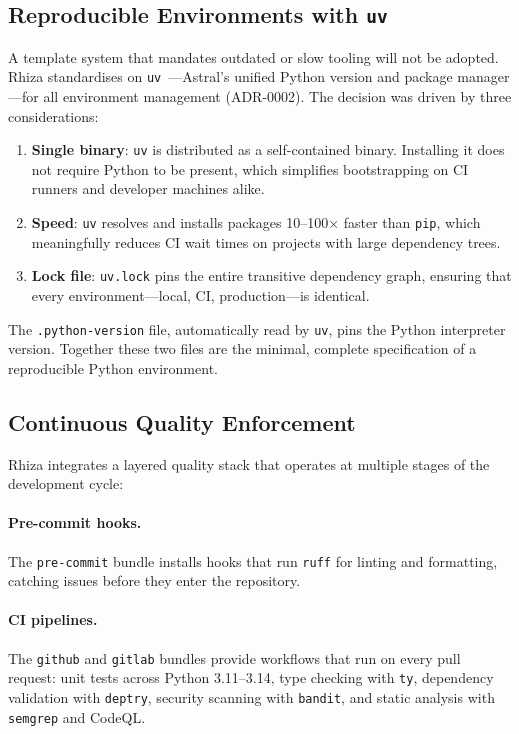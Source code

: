\documentclass[12pt,a4paper]{article}
\begin{document}
\subsection{Reproducible Environments with \texttt{uv}}

A template system that mandates outdated or slow tooling will not be adopted. Rhiza standardises on \texttt{uv}~\cite{uv}---Astral's unified Python version and package manager---for all environment management (ADR-0002). The decision was driven by three considerations:

\begin{enumerate}[leftmargin=*]
  \item \textbf{Single binary}: \texttt{uv} is distributed as a self-contained binary. Installing it does not require Python to be present, which simplifies bootstrapping on CI runners and developer machines alike.
  \item \textbf{Speed}: \texttt{uv} resolves and installs packages 10--100$\times$ faster than \texttt{pip}, which meaningfully reduces CI wait times on projects with large dependency trees.
  \item \textbf{Lock file}: \texttt{uv.lock} pins the entire transitive dependency graph, ensuring that every environment---local, CI, production---is identical.
\end{enumerate}

The \texttt{.python-version} file, automatically read by \texttt{uv}, pins the Python interpreter version. Together these two files are the minimal, complete specification of a reproducible Python environment.

\subsection{Continuous Quality Enforcement}

Rhiza integrates a layered quality stack that operates at multiple stages of the development cycle:

\paragraph{Pre-commit hooks.} The \texttt{pre-commit} bundle installs hooks that run \texttt{ruff} for linting and formatting, catching issues before they enter the repository.

\paragraph{CI pipelines.} The \texttt{github} and \texttt{gitlab} bundles provide workflows that run on every pull request: unit tests across Python 3.11--3.14, type checking with \texttt{ty}, dependency validation with \texttt{deptry}, security scanning with \texttt{bandit}, and static analysis with \texttt{semgrep} and CodeQL.
\end{document}
